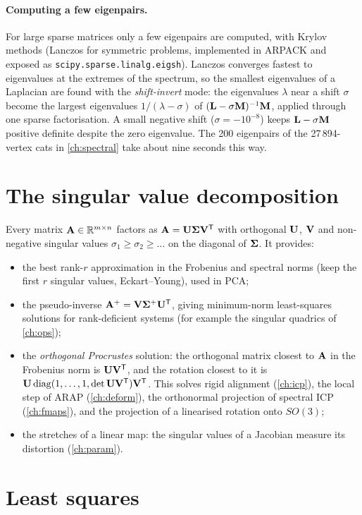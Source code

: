 \paragraph{Computing a few eigenpairs.} For large sparse matrices only a few eigenpairs are computed,
with Krylov methods (Lanczos for symmetric problems, implemented in ARPACK and exposed as
\texttt{scipy.sparse.linalg.eigsh}). Lanczos converges fastest to eigenvalues at the extremes of the
spectrum, so the smallest eigenvalues of a Laplacian are found with the \emph{shift-invert} mode: the
eigenvalues $\lambda$ near a shift $\sigma$ become the largest eigenvalues $1/(\lambda-\sigma)$ of
$(\mathbf{L}-\sigma\mathbf{M})^{-1}\mathbf{M}$, applied through one sparse factorisation. A small negative shift
($\sigma=-10^{-8}$) keeps $\mathbf{L}-\sigma\mathbf{M}$ positive definite despite the zero eigenvalue. The 200
eigenpairs of the 27\,894-vertex cats in \cref{ch:spectral} take about nine seconds this way.

\section{The singular value decomposition}

Every matrix $\mathbf{A}\in\mathbb{R}^{m\times n}$ factors as $\mathbf{A}=\mathbf{U}\boldsymbol{\Sigma}\mathbf{V}^{\mathsf{T}}$ with orthogonal $\mathbf{U}$, $\mathbf{V}$ and
non-negative singular values $\sigma_1\ge\sigma_2\ge\dots$ on the diagonal of $\boldsymbol{\Sigma}$. It provides:
\begin{itemize}
  \item the best rank-$r$ approximation in the Frobenius and spectral norms (keep the first $r$
  singular values, Eckart--Young), used in PCA;
  \item the pseudo-inverse $\mathbf{A}^+=\mathbf{V}\boldsymbol{\Sigma}^+\mathbf{U}^{\mathsf{T}}$, giving minimum-norm least-squares solutions for
  rank-deficient systems (for example the singular quadrics of \cref{ch:ops});
  \item the \emph{orthogonal Procrustes} solution: the orthogonal matrix closest to $\mathbf{A}$ in the
  Frobenius norm is $\mathbf{U}\mathbf{V}^{\mathsf{T}}$, and the rotation closest to it is
  $\mathbf{U}\operatorname{diag}(1,\dots,1,\det\mathbf{U}\mathbf{V}^{\mathsf{T}})\mathbf{V}^{\mathsf{T}}$. This solves rigid alignment (\cref{ch:icp}), the local step of
  ARAP (\cref{ch:deform}), the orthonormal projection of spectral ICP (\cref{ch:fmaps}), and the
  projection of a linearised rotation onto $SO(3)$;
  \item the stretches of a linear map: the singular values of a Jacobian measure its distortion
  (\cref{ch:param}).
\end{itemize}

\section{Least squares}

